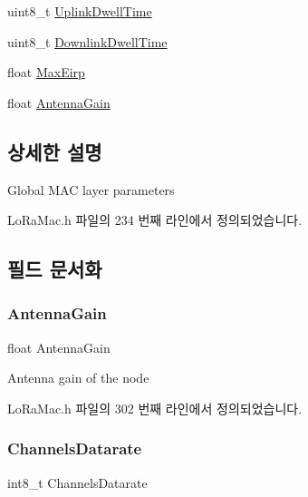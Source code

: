 \begin{DoxyCompactItemize}
\item 
uint8\+\_\+t \mbox{\hyperlink{structs_lo_ra_mac_params_a0e6663762d6f9173bc8d8cb018f8f17a}{Uplink\+Dwell\+Time}}
\item 
uint8\+\_\+t \mbox{\hyperlink{structs_lo_ra_mac_params_a63074ce7d23ff98956f5d6f4054f235f}{Downlink\+Dwell\+Time}}
\item 
float \mbox{\hyperlink{structs_lo_ra_mac_params_abacf3c28f803460c8947f0b0077fcf5c}{Max\+Eirp}}
\item 
float \mbox{\hyperlink{structs_lo_ra_mac_params_a727eaefd87f898a5238118573968962c}{Antenna\+Gain}}
\end{DoxyCompactItemize}


\subsection{상세한 설명}
Global M\+AC layer parameters 

Lo\+Ra\+Mac.\+h 파일의 234 번째 라인에서 정의되었습니다.



\subsection{필드 문서화}
\mbox{\label{structs_lo_ra_mac_params_a727eaefd87f898a5238118573968962c}} 
\subsubsection{\texorpdfstring{Antenna\+Gain}{AntennaGain}}
{\footnotesize\ttfamily float Antenna\+Gain}

Antenna gain of the node 

Lo\+Ra\+Mac.\+h 파일의 302 번째 라인에서 정의되었습니다.

\mbox{\label{structs_lo_ra_mac_params_a6c741587260d08d1b883922ce9ca345e}} 
\subsubsection{\texorpdfstring{Channels\+Datarate}{ChannelsDatarate}}
{\footnotesize\ttfamily int8\+\_\+t Channels\+Datarate}

